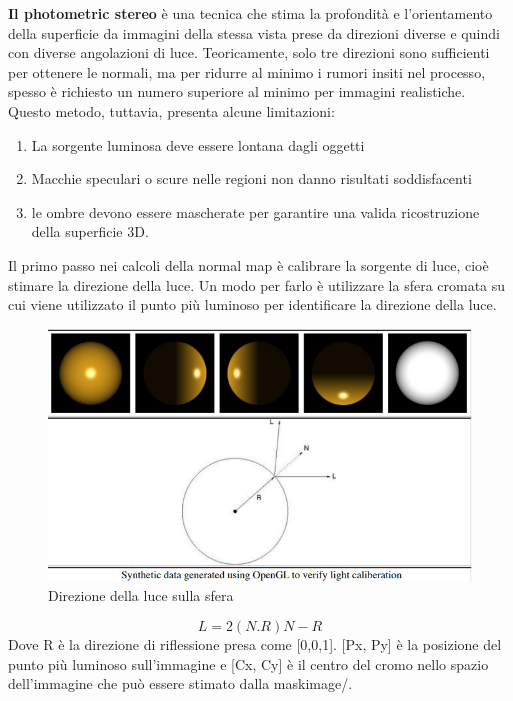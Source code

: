 \textbf{Il photometric stereo} è una tecnica che stima la profondità e l'orientamento della superficie da immagini della stessa vista prese da direzioni diverse e quindi con diverse angolazioni di luce.
\newline
Teoricamente, solo tre direzioni sono sufficienti per ottenere le normali, ma per ridurre al minimo i rumori insiti nel processo, spesso è richiesto un numero superiore al minimo per immagini realistiche. \cite{verma1999photometric}
\newline
Questo metodo, tuttavia, presenta alcune limitazioni:
\begin{enumerate}
	\item La sorgente luminosa deve essere lontana dagli oggetti
	\item Macchie speculari o scure nelle regioni non danno risultati soddisfacenti
	\item le ombre devono essere mascherate per garantire una valida ricostruzione della superficie 3D.
\end{enumerate}
Il primo passo nei calcoli della normal map è calibrare la sorgente di luce, cioè stimare la direzione della luce.
\newline
Un modo per farlo è utilizzare la sfera cromata su cui viene utilizzato il punto più luminoso per identificare la direzione della luce.
\begin{figure}[h]
	\begin{center}
		\includegraphics[scale=0.5]{figure/capitolo4/sphere.png}
	\end{center}
	\caption{Direzione della luce sulla sfera }	
\end{figure}
		\begin{equation}
		L=2(N.R)N-R
		\end{equation}
Dove R è la direzione di riflessione presa come [0,0,1]. [Px, Py] è la posizione del punto più luminoso sull'immagine e [Cx, Cy] è il centro del cromo nello spazio dell'immagine che può essere stimato dalla maskimage/.
